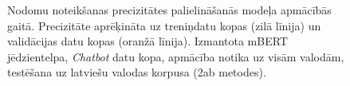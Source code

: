 \begin{figure}[h] 
   \centering
   \caption{Nodomu noteikšanas precizitātes palielināšanās modeļa apmācībās gaitā. Precizitāte aprēķināta uz treniņdatu kopas (zilā līnija) un validācijas datu kopas (oranžā līnija). Izmantota mBERT jēdzientelpa, \textit{Chatbot} datu kopa, apmācība notika uz visām valodām, testēšana uz latviešu valodas korpusa (2ab metodes).} 
   \label{fig:chatbot-bert-all}
\end{figure}


